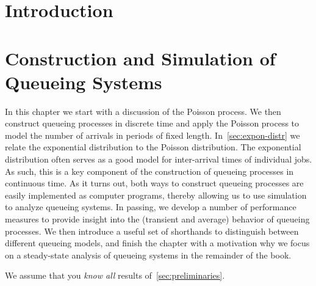 \author{Nicky D. van  Foreest}


\frontmatter
\maketitle

\tableofcontents

\chapter{Introduction}
\label{cha:introduction}


\clearpage



\mainmatter

\chapter{Construction and Simulation of Queueing Systems}
\label{cha:single-stat-queu}

In this chapter we start with a discussion of the Poisson process.
We then construct queueing processes in discrete time and apply the Poisson process to model the number of arrivals in periods of fixed length.
In~\cref{sec:expon-distr} we relate the exponential distribution to the Poisson distribution.
The exponential distribution often serves as a good model for inter-arrival times of individual jobs.
As such, this is a key component of the construction of queueing processes in continuous time.
As it turns out, both ways to construct queueing processes are easily implemented as computer programs, thereby allowing us to use simulation to analyze queueing systems.
In passing, we develop a number of performance measures to provide insight into the (transient and average) behavior of queueing processes.
We then introduce a useful set of shorthands to distinguish between different queueing models, and finish the chapter with a motivation why we focus on a steady-state analysis of queueing systems in the remainder of the book.

We assume that you  \emph{know all} results of~\cref{sec:preliminaries}. 








